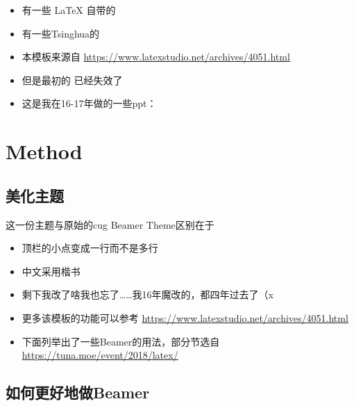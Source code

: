 \documentclass{beamer}
\begin{document}
\begin{frame}
    \begin{itemize}
        \item 有一些 \LaTeX{} 自带的
        \item 有一些Tsinghua的
        \item 本模板来源自 \newline \url{https://www.latexstudio.net/archives/4051.html}
        \item 但是最初的 \href{http://far.tooold.cn/post/latex/beamertsinghua}{\color{purple}{link}} \cite{origin}已经失效了
        \item 这是我在16-17年做的一些ppt：\href{https://github.com/Trinkle23897/oi_slides}{\color{purple}{戳我}}
    \end{itemize}
\end{frame}


\section{Method}

\subsection{美化主题}

\begin{frame}{这一份主题与原始的cug Beamer Theme区别在于}
    \begin{itemize}
        \item 顶栏的小点变成一行而不是多行
        \item 中文采用楷书
        \item 剩下我改了啥我也忘了……我16年魔改的，都四年过去了（x
        \item 更多该模板的功能可以参考 \url{https://www.latexstudio.net/archives/4051.html}
        \item 下面列举出了一些Beamer的用法，部分节选自 \url{https://tuna.moe/event/2018/latex/}
    \end{itemize}
\end{frame}

\subsection{如何更好地做Beamer}
\end{document}
